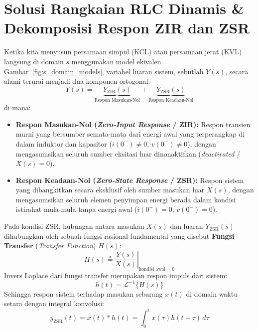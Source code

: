 \documentclass[11pt,a4paper]{article}
\theoremstyle{definition}
\begin{document}
\section{Solusi Rangkaian RLC Dinamis \& Dekomposisi Respon ZIR dan ZSR}

Ketika kita menyusun persamaan simpul (KCL) atau persamaan jerat (KVL) langsung di domain $s$ menggunakan model ekivalen Gambar~\ref{fig:s_domain_models}, variabel luaran sistem, sebutlah $Y(s)$, secara alami terurai menjadi dua komponen ortogonal:
\begin{equation}
    Y(s) = \underbrace{Y_{\text{ZIR}}(s)}_{\text{Respon Masukan-Nol}} + \underbrace{Y_{\text{ZSR}}(s)}_{\text{Respon Keadaan-Nol}}
    \label{eq:zir_zsr_split}
\end{equation}
di mana:
\begin{itemize}[leftmargin=*]
    \item \textbf{Respon Masukan-Nol (\textit{Zero-Input Response} / ZIR):} Respon transien murni yang bersumber semata-mata dari energi awal yang terperangkap di dalam induktor dan kapasitor ($i(0^-) \ne 0$, $v(0^-) \ne 0$), dengan mengasumsikan seluruh sumber eksitasi luar dinonaktifkan (\textit{deactivated} / $X(s) = 0$).
    \item \textbf{Respon Keadaan-Nol (\textit{Zero-State Response} / ZSR):} Respon sistem yang dibangkitkan secara eksklusif oleh sumber masukan luar $X(s)$, dengan mengasumsikan seluruh elemen penyimpan energi berada dalam kondisi istirahat mula-mula tanpa energi awal ($i(0^-) = 0$, $v(0^-) = 0$).
\end{itemize}

Pada kondisi ZSR, hubungan antara masukan $X(s)$ dan luaran $Y_{\text{ZSR}}(s)$ dihubungkan oleh sebuah fungsi rasional fundamental yang disebut \textbf{Fungsi Transfer} (\textit{Transfer Function}) $H(s)$:
\begin{equation}
    H(s) \triangleq \left. \frac{Y(s)}{X(s)} \right|_{\text{kondisi awal} = 0}
    \label{eq:transfer_function}
\end{equation}
Invers Laplace dari fungsi transfer merupakan respon impuls dari sistem:
\begin{equation}
    h(t) = \mathcal{L}^{-1}\{H(s)\}
\end{equation}
Sehingga respon sistem terhadap masukan sebarang $x(t)$ di domain waktu setara dengan integral konvolusi:
\begin{equation}
    y_{\text{ZSR}}(t) = x(t) * h(t) = \int_{0}^{t} x(\tau) h(t - \tau) \, d\tau
\end{equation}
\end{document}
